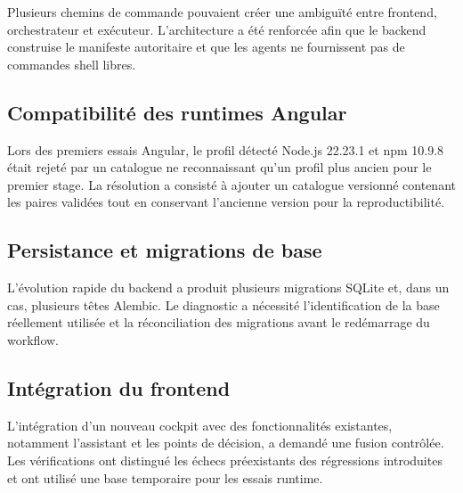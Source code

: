 Plusieurs chemins de commande pouvaient créer une ambiguïté entre frontend, orchestrateur et exécuteur. L'architecture a été renforcée afin que le backend construise le manifeste autoritaire et que les agents ne fournissent pas de commandes shell libres.

\subsection{Compatibilité des runtimes Angular}

Lors des premiers essais Angular, le profil détecté Node.js 22.23.1 et npm 10.9.8 était rejeté par un catalogue ne reconnaissant qu'un profil plus ancien pour le premier stage. La résolution a consisté à ajouter un catalogue versionné contenant les paires validées tout en conservant l'ancienne version pour la reproductibilité.

\subsection{Persistance et migrations de base}

L'évolution rapide du backend a produit plusieurs migrations SQLite et, dans un cas, plusieurs têtes Alembic. Le diagnostic a nécessité l'identification de la base réellement utilisée et la réconciliation des migrations avant le redémarrage du workflow.

\subsection{Intégration du frontend}

L'intégration d'un nouveau cockpit avec des fonctionnalités existantes, notamment l'assistant et les points de décision, a demandé une fusion contrôlée. Les vérifications ont distingué les échecs préexistants des régressions introduites et ont utilisé une base temporaire pour les essais runtime.

